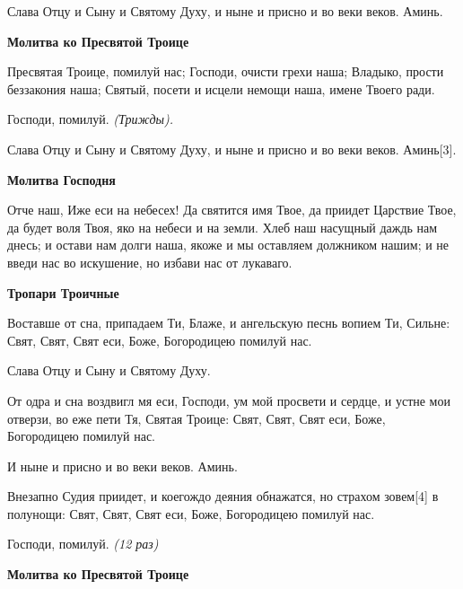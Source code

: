    Слава Отцу и Сыну и Святому Духу, и ныне и присно и во веки веков.
Аминь.



 

\bfseries Молитва ко Пресвятой Троице\normalfont{}


   Пресвятая Троице, помилуй нас; Господи, очисти грехи наша; Владыко,
прости беззакония наша; Святый, посети и исцели немощи наша, имене
Твоего ради.



   Господи, помилуй. \itshape  (Трижды)\normalfont{}.



   Слава Отцу и Сыну и Святому Духу, и ныне и присно и во веки веков.
Аминь[3].



 

\bfseries Молитва Господня\normalfont{}


   Отче наш, Иже еси на небесех! Да святится имя Твое, да приидет
Царствие Твое, да будет воля Твоя, яко на небеси и на земли. Хлеб наш
насущный даждь нам днесь; и остави нам долги наша, якоже и мы оставляем
должником нашим; и не введи нас во искушение, но избави нас от
лукаваго.



 

\bfseries Тропари Троичные\normalfont{}


   Воставше от сна, припадаем Ти, Блаже, и ангельскую песнь вопием Ти,
Сильне: Свят, Свят, Свят еси, Боже, Богородицею помилуй нас.



   Слава Отцу и Сыну и Святому Духу.



   От одра и сна воздвигл мя еси, Господи, ум мой просвети и сердце, и
устне мои отверзи, во еже пети Тя, Святая Троице: Свят, Свят, Свят еси,
Боже, Богородицею помилуй нас.



   И ныне и присно и во веки веков. Аминь.




   Внезапно Судия приидет, и коегождо деяния обнажатся, но страхом
зовем[4] в
полунощи: Свят, Свят, Свят еси, Боже, Богородицею помилуй нас.



   Господи, помилуй. \itshape  (12 раз)\normalfont{}



 

\bfseries Молитва ко Пресвятой Троице\normalfont{}


